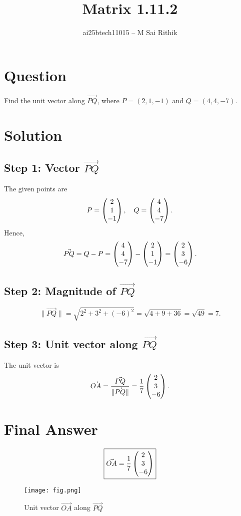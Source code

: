 \documentclass[12pt]{article}
\title{Matrix 1.11.2}
\author{ai25btech11015 -- M Sai Rithik}
\date{}
\begin{document}
\maketitle

\section*{Question}
Find the unit vector along $\Vec{PQ}$, where $P=(2,1,-1)$ and $Q=(4,4,-7)$.  


\section*{Solution}

\subsection*{Step 1: Vector $\Vec{PQ}$}
The given points are
\[
P = \begin{pmatrix}2 \\ 1 \\ -1\end{pmatrix}, 
\quad Q = \begin{pmatrix}4 \\ 4 \\ -7\end{pmatrix}.
\]
Hence,
\begin{equation}
\Vec{PQ} = Q - P = \begin{pmatrix}4 \\ 4 \\ -7\end{pmatrix} - \begin{pmatrix}2 \\ 1 \\ -1\end{pmatrix}
= \begin{pmatrix}2 \\ 3 \\ -6\end{pmatrix}.
\end{equation}

\subsection*{Step 2: Magnitude of $\Vec{PQ}$}
\begin{equation}
\|\Vec{PQ}\| = \sqrt{2^2 + 3^2 + (-6)^2}
= \sqrt{4+9+36}
= \sqrt{49} = 7.
\end{equation}

\subsection*{Step 3: Unit vector along $\Vec{PQ}$}
The unit vector is
\begin{equation}
\Vec{OA} = \frac{\Vec{PQ}}{\|\Vec{PQ}\|}
= \frac{1}{7}\begin{pmatrix}2 \\ 3 \\ -6\end{pmatrix}.
\end{equation}

\section*{Final Answer}
\[
\boxed{\Vec{OA} = \frac{1}{7}\begin{pmatrix}2 \\ 3 \\ -6\end{pmatrix}}
\]

\begin{figure}[h!]
    \centering
    \texttt{[image: fig.png]}
    \caption{Unit vector $\Vec{OA}$ along $\Vec{PQ}$}
\end{figure}
\end{document}
